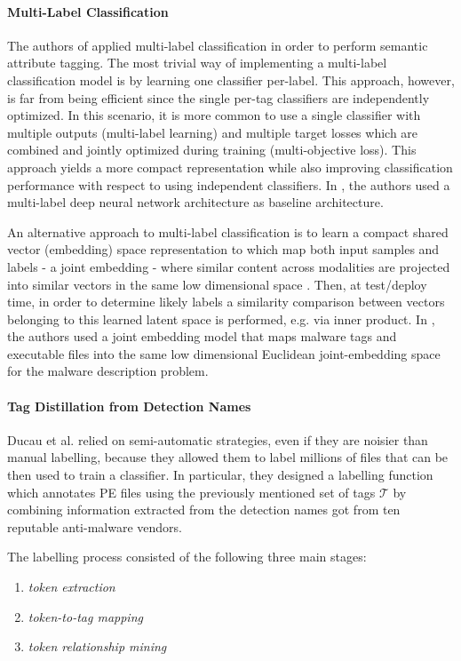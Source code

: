 \documentclass[pdfa%
,cucitura%
]{toptesi}
\begin{document}
\paragraph{Multi-Label Classification}
The authors of \cite{DucauAMDATSE} applied multi-label classification in order to perform semantic attribute tagging. The most trivial way of implementing a multi-label classification model is by learning one classifier per-label. This approach, however, is far from being efficient since the single per-tag classifiers are independently optimized. In this scenario, it is more common to use a single classifier with multiple outputs (multi-label learning) and multiple target losses which are combined and jointly optimized during training (multi-objective loss). This approach yields a more compact representation while also improving classification performance with respect to using independent classifiers. In \cite{DucauAMDATSE}, the authors used a multi-label deep neural network architecture as baseline architecture.

An alternative approach to multi-label classification is to learn a compact shared vector (embedding) space representation to which map both input samples and labels - a joint embedding - where similar content across modalities are projected into similar vectors in the same low dimensional space \cite{DucauAMDATSE}. Then, at test/deploy time, in order to determine likely labels a similarity comparison between vectors belonging to this learned latent space is performed, e.g. via inner product. In \cite{DucauAMDATSE}, the authors used a joint embedding model that maps malware tags and executable files into the same low dimensional Euclidean joint-embedding space for the malware description problem.

\color{Black}
\paragraph{Tag Distillation from Detection Names}
Ducau et al. \cite{DucauAMDATSE} relied on semi-automatic strategies, even if they are noisier than manual labelling, because they allowed them to label millions of files that can be then used to train a classifier. In particular, they designed a labelling function which annotates PE files using the previously mentioned set of tags $\mathcal{T}$ by combining information extracted from the detection names got from ten reputable anti-malware vendors.

The labelling process consisted of the following three main stages:
\begin{enumerate}
	\item \textit{token extraction}
	
	\item \textit{token-to-tag mapping}
	
	\item \textit{token relationship mining}
\end{enumerate}
\end{document}

